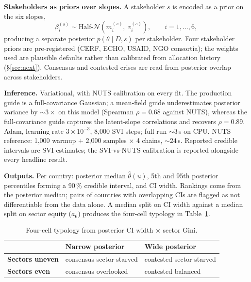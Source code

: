 \documentclass[11pt,a4paper]{article}
\begin{document}
\textbf{Stakeholders as priors over slopes.} A stakeholder $s$ is encoded as
a prior on the six slopes,
\begin{equation}
\beta_i^{(s)} \sim \text{Half-}\mathcal{N}(m_i^{(s)},\; v_i^{(s)}),\qquad i = 1, \ldots, 6,
\label{eq:stake}
\end{equation}
producing a separate posterior $p(\theta \mid D, s)$ per stakeholder. Four
stakeholder priors are pre-registered (CERF, ECHO, USAID, NGO consortia);
the weights used are plausible defaults rather than calibrated from allocation
history (\S\ref{sec:next}). Consensus and contested crises are read from
posterior overlap across stakeholders.

\textbf{Inference.} Variational, with NUTS calibration on every fit. The
production guide is a full-covariance Gaussian; a mean-field guide
underestimates posterior variance by ${\sim}3\times$ on this model
(Spearman $\rho = 0.68$ against NUTS), whereas the full-covariance guide
captures the latent-slope correlations and recovers $\rho = 0.89$. Adam,
learning rate $3\times 10^{-3}$, 8{,}000 SVI steps; full run ${\sim}3$\,s
on CPU. NUTS reference: 1{,}000 warmup $+$ 2{,}000 samples $\times$ 4 chains,
${\sim}24$\,s. Reported credible intervals are SVI estimates; the SVI-vs-NUTS
calibration is reported alongside every headline result.

\textbf{Outputs.} Per country: posterior median $\widehat\theta(u)$, 5th and
95th posterior percentiles forming a 90\,\% credible interval, and CI width.
Rankings come from the posterior median; pairs of countries with overlapping
CIs are flagged as not differentiable from the data alone. A median split on
CI width against a median split on sector equity ($a_6$) produces the
four-cell typology in Table~\ref{tab:typology}.

\begin{table}[H]
\centering
\small
\begin{tabular}{@{}lll@{}}
\toprule
 & \textbf{Narrow posterior} & \textbf{Wide posterior} \\
\midrule
\textbf{Sectors uneven} & consensus sector-starved & contested sector-starved \\
\textbf{Sectors even}   & consensus overlooked     & contested balanced \\
\bottomrule
\end{tabular}
\caption{Four-cell typology from posterior CI width $\times$ sector Gini.\label{tab:typology}}
\end{table}
\end{document}
